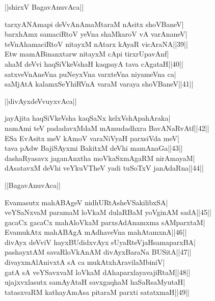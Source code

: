 \documentclass{article}
\begin{document}
\begin{center}
||shirxV BagavAnuvAca||
\end{center}

tarxyANAmapi deVvAnAmaMtaraM nAsitx shoVBaneV|\\
barxhAmx samaciRtoV yeVna shaMkaroV vA varAnaneV|\\
teVnAhamaciRtoV nitayxM nAtarx kAyaR vicAraNA||39||\\
Etw mamABinanxtarw nitayxM cApi tirxrUpavAnf|\\
ahaM deVvi haqSiVkeVshaH kaqpayA tava cAgataH||40||\\
satxveVnAneVna puNeyxVna varxteVna niyameVna ca|\\
saMjAtA kalamxSeYhiRVnA varaM varaya shoVBaneV||41||\\

\begin{center}
||divAyxdeVvuyxvAca||
\end{center}

jayAjita haqSiVkeVsha kaqSaNx kelxVshApahAraka|\\
namAmi teV padadavxMdaM mAmudadhxra BavANaRvAtf||42||\\
ESa EvAsitx meV kAmoV varaNiVyaH parxsiVda meV|\\
tava pAdw BajiSAyxmi BakitxM deVhi mamAnaGa||43||\\
dashaRyasavx jaganAnxtha moVkaSxmAgaRM nirAmayaM|\\
dAsatavxM deVhi veYkuVTheV yadi tuSoTxV janAdaRna||44||\\

\begin{center}
||BagavAnuvAca||
\end{center}

Evamasutx mahABAgeV nidhURtAsheVSakilibxSA|\\
veYSaNxvaM paramaM loVkaM dulaRBaM yoVginAM sadA||45||\\
gacaCx gacaCx mahAloVkaM parxsAdAnamxma sAMparxtaM|\\
EvamukAtx mahABAgA mAdhaveVna mahAtamxnA||46||\\
divAyx deVviV hayxBUdidxvAyx sUyaRteVjaHsamaparxBA|\\
pashayxtAM savaRloVkAnAM divAyxBaraNa BUSitA||47||\\
divayxmAlAnivxtA sA ca mukAtxhAravilaMbiniV|\\
gatA sA veYSavxvaM loVkaM dAhaparxlayavajiRtaM||48||\\
ujajxvxlasutx samAyAtaH savxgaqhaM haSaRsaMyutaH|\\
tatasxvaRM kathayAmAsa pitaraM parxti satatxmaH||49||
\end{document}
